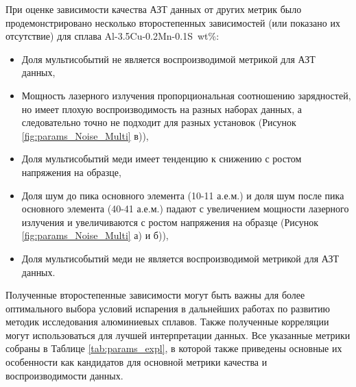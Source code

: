При оценке зависимости качества АЗТ данных от других метрик было продемонстрировано несколько второстепенных зависимостей (или показано их отсутствие) для сплава Al-3.5Cu-0.2Mn-0.1S~wt\%:

\begin{itemize}
	\item Доля мультисобытий не является воспроизводимой метрикой для АЗТ данных,
	\item Мощность лазерного излучения пропорциональная соотношению зарядностей, но имеет плохую воспроизводимость на разных наборах данных, а следовательно точно не подходит для разных установок (Рисунок \cref{fig:params_Noise_Multi} в)),	
	\item Доля мультисобытий меди имеет тенденцию к снижению с ростом напряжения на образце,
	\item Доля шум до пика основного элемента (10-11 а.е.м.) и доля шум после пика основного элемента (40-41 а.е.м.)	падают с увеличением мощности лазерного излучения и увеличиваются с ростом напряжения на образце (Рисунок \cref{fig:params_Noise_Multi} а) и б)),
	\item Доля мультисобытий меди не является воспроизводимой метрикой для АЗТ данных.	
\end{itemize}

Полученные второстепенные зависимости могут быть важны для более оптимального выбора условий испарения в дальнейших работах по развитию методик исследования алюминиевых сплавов. Также полученные корреляции могут использоваться для лучшей интерпретации данных. Все указанные метрики собраны в Таблице \cref{tab:params_expl}, в которой также приведены основные их особенности как кандидатов для основной метрики качества и воспроизводимости данных.


